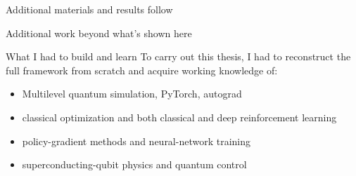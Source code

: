 \documentclass{beamer}
\begin{document}
\begin{frame}
    \centering
    Additional materials and results follow
\end{frame}

\begin{frame}{Additional work beyond what's shown here}
\scriptsize

\begin{alertblock}{What I had to build and learn}
To carry out this thesis, I had to reconstruct the full framework from scratch and acquire working knowledge of:
\begin{itemize}
    \item Multilevel quantum simulation, PyTorch, autograd
    \item classical optimization and both classical and deep reinforcement learning
    \item policy-gradient methods and neural-network training
    \item superconducting-qubit physics and quantum control
\end{itemize}
\end{alertblock}
\let\thefootnote\relax{}
\end{frame}
\end{document}

